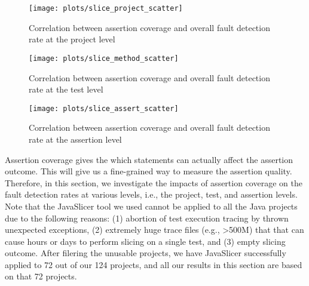 \begin{figure}
\center
\texttt{[image: plots/slice\_project\_scatter]}
\caption{\label{fig:assert_cover_proj}Correlation between assertion coverage and overall fault detection rate at the project level}
\end{figure}

\begin{figure}
\center
\texttt{[image: plots/slice\_method\_scatter]}
\caption{\label{fig:assert_cover_test}Correlation between assertion coverage and overall fault detection rate at the test level}
\end{figure}

\begin{figure}
\center
\texttt{[image: plots/slice\_assert\_scatter]}
\caption{\label{fig:assert_cover_assert}Correlation between assertion coverage and overall fault detection rate at the assertion level}
\end{figure}


Assertion coverage gives the which statements can actually affect the
assertion outcome. This will give us a fine-grained way to measure the
assertion quality.  Therefore, in this section, we investigate the
impacts of assertion coverage on the fault detection rates at various
levels, i.e., the project, test, and assertion levels. Note that the
JavaSlicer tool we used cannot be applied to all the Java projects due
to the following reasons: (1) abortion of test execution
tracing by thrown unexpected exceptions, (2) extremely huge trace
files (e.g., >500M) that that can cause hours or days to perform
slicing on a single test, and (3) empty slicing outcome. After
filering the unusable projects, we have JavaSlicer successfully
applied to 72 out of our 124 projects, and all our results in this
section are based on that 72 projects. 


